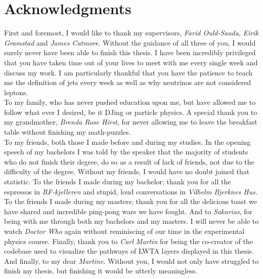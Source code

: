\chapter*{Acknowledgments}
First and foremost, I would like to thank my supervisors, \emph{Farid Ould-Saada}, \emph{Eirik Gramstad} and \emph{James Catmore}. 
Without the guidance of all three of you, I would surely never have been able to finish this thesis. I have been incredibly
privileged that you have taken time out of your lives to meet with me every single week and discuss my work. 
I am particularly thankful that you have the patience to teach me the definition of jets every week as well as
why neutrinos are not considered leptons.
\\\newline
To my family, who has never pushed education upon me, but have allowed me to follow what ever I desired, be it DJing or 
particle physics. A special thank you to my grandmother, \emph{Brenda Rose Hirst}, for never allowing me to leave the breakfast table 
without finishing my math-puzzles.
\\\newline
To my friends, both those I made before and during my studies. In the opening speech of my bachelors I was told by the speaker that 
the majority of students who do not finish their degree, do so as a result of lack of friends, not due to the difficulty of the degree.
Without my friends, I would have no doubt joined that statistic. To the friends I made during my bachelor; thank you for all the espressos in \emph{RF-kjelleren}
and stupid, loud conversations in \emph{Vilhelm Bjerknes Hus}. To the friends I made during my masters; thank you for all the delicious toast we have shared and 
incredible ping-pong wars we have fought. And to \emph{Sakarias}, for being with me through both my bachelors and my masters. I will never be able 
to watch \emph{Doctor Who} again without reminiscing of our time in the experimental physics course. Finally, thank you to \emph{Carl Martin} 
for being the co-creator of the codebase used to visualize the pathways of \acs{LWTA} layers displayed in this thesis. 
\\\newline
And finally, to my dear \emph{Martine}. Without you, I would not only have struggled to finish my thesis, but finishing it would be utterly 
meaningless.